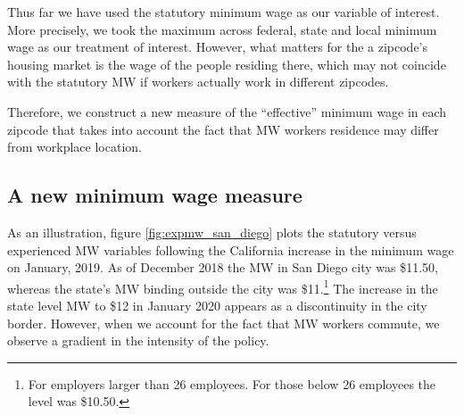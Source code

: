 
Thus far we have used the statutory minimum wage as our variable of interest. More 
precisely, we took the maximum across federal, state and local minimum wage as our 
treatment of interest. However, what matters for the a zipcode's housing market is 
the wage of the people residing there, which may not coincide with the statutory MW
if workers actually work in different zipcodes.

Therefore, we construct a new measure of the ``effective'' minimum wage in each zipcode 
that takes into account the fact that MW workers residence may differ from workplace 
location.



\subsection{A new minimum wage measure}



As an illustration, figure \ref{fig:expmw_san_diego} plots the statutory versus experienced 
MW variables following the California increase in the minimum wage on January, 2019. As of 
December 2018 the MW in San Diego city was \$11.50, whereas the state's MW binding outside 
the city was \$11.\footnote{For employers larger than 26 employees. For those below 26 
	employees the level was \$10.50.}
The increase in the state level MW to \$12 in January 2020 appears as a discontinuity in the 
city border. However, when we account for the fact that MW workers commute, we observe a 
gradient in the intensity of the policy.


